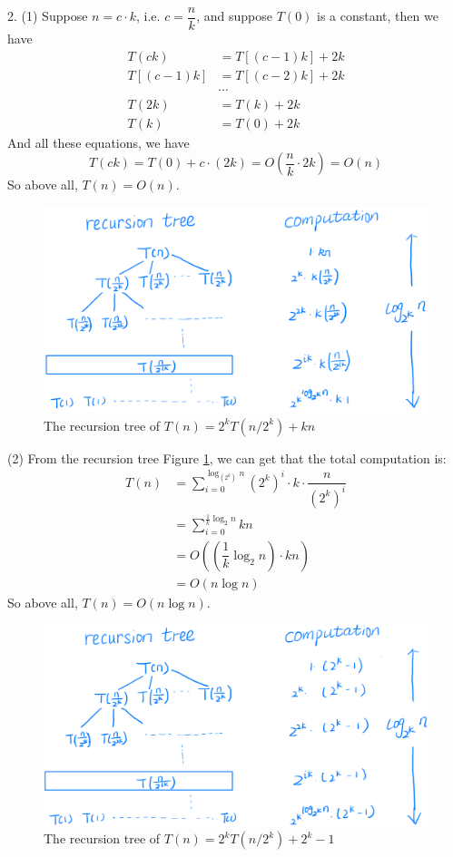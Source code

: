 2. (1) Suppose $n=c\cdot k$, i.e. $c=\dfrac{n}{k}$, and suppose $T(0)$ is a constant, then we have
\begin{align*}
    T(ck) &= T[(c-1)k]+2k\\
    T[(c-1)k] &= T[(c-2)k]+2k\\
    &\cdots\\
    T(2k) &= T(k)+2k\\
    T(k) &= T(0)+2k
\end{align*}
And all these equations, we have
$$T(ck)=T(0)+c\cdot (2k)=O\left(\dfrac{n}{k}\cdot 2k\right)=O(n)$$
So above all, $T(n)=O(n)$.\\

\begin{figure}[htbp]
    \centering
    \includegraphics[width=\linewidth]{./figure/t1_22.png}
    \caption{The recursion tree of $T(n) = 2^kT(n/2^k) + kn$}
    \label{fig:t1_22}
\end{figure}

(2) From the recursion tree Figure \ref{fig:t1_22}, we can get that the total computation is:
\begin{align*}
    T(n) &= \sum_{i=0}^{\log_{(2^k)}{n}}(2^k)^i\cdot k\cdot\dfrac{n}{(2^k)^i}\\
         &= \sum_{i=0}^{\frac{1}{k}\log_{2}{n}} kn\\
         &= O((\dfrac{1}{k}\log_{2}{n})\cdot kn)\\
         &= O(n\log{n})
\end{align*}
So above all, $T(n)=O(n\log n)$.\\

\begin{figure}[htbp]
    \centering
    \includegraphics[width=\linewidth]{./figure/t1_23.png}
    \caption{The recursion tree of $T(n) = 2^kT(n/2^k) + 2^k-1$}
    \label{fig:t1_23}
\end{figure}

